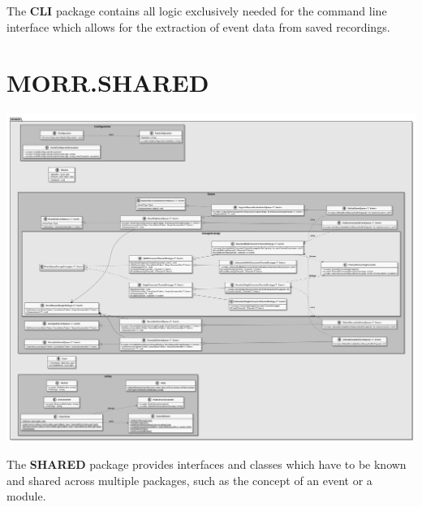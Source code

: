 The \textbf{CLI} package contains all logic exclusively needed for the command line interface which allows for the extraction of event data from saved recordings.

\begin{packif}
\end{packif}

\begin{packclass}
\end{packclass}

\newpage
\section{MORR.SHARED}

\begin{center}
    \includegraphics[width=1.0\textwidth]{resources/Packages/SHARED.png}
\end{center}

The \textbf{SHARED} package provides interfaces and classes which have to be known and shared across multiple packages, such as the concept of an event or a module.

\begin{packif}
\end{packif}

